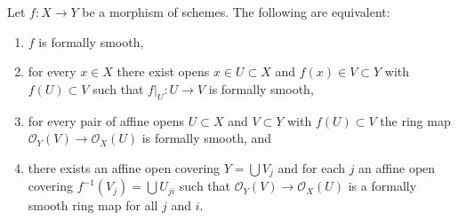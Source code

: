 \begin{lemma}
\label{lemma-formally-smooth}
Let $f : X \to Y$ be a morphism of schemes. The following are equivalent:
\begin{enumerate}
\item $f$ is formally smooth,
\item for every $x \in X$ there exist opens $x \in U \subset X$ and
$f(x) \in V \subset Y$ with $f(U) \subset V$ such that
$f|_U : U \to V$ is formally smooth,
\item for every pair of affine opens $U \subset X$ and $V \subset Y$
with $f(U) \subset V$ the ring map $\mathcal{O}_Y(V) \to \mathcal{O}_X(U)$
is formally smooth, and
\item there exists an affine open covering $Y = \bigcup V_j$ and
for each $j$ an affine open covering $f^{-1}(V_j) = \bigcup U_{ji}$
such that $\mathcal{O}_Y(V) \to \mathcal{O}_X(U)$ is a formally smooth
ring map for all $j$ and $i$.
\end{enumerate}
\end{lemma}

